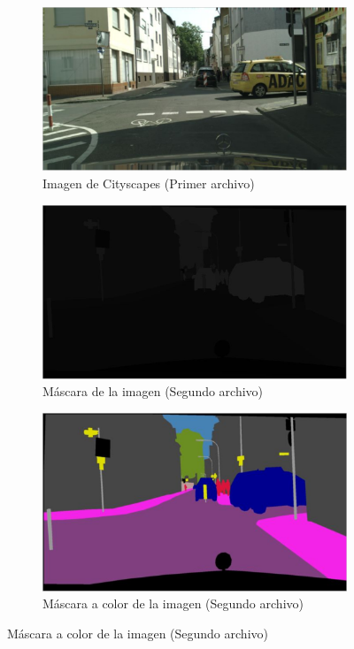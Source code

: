 \begin{figure}[H]
  \centering
    \begin{subfigure}[b]{0.45\linewidth}
    \includegraphics[width=\linewidth]{Figuras/Imagen_Cityscapes.eps}
    \caption{Imagen de Cityscapes (Primer archivo)}
  \end{subfigure}
    \begin{subfigure}[b]{0.45\linewidth}
    \includegraphics[width=\linewidth]{Figuras/Mascara_Cityscapes.eps}
    \caption{Máscara de la imagen (Segundo archivo)}
  \end{subfigure}
      \begin{subfigure}[b]{0.45\linewidth}
    \includegraphics[width=\linewidth]{Figuras/Mascara_Color.eps}
    \caption{Máscara a color de la imagen (Segundo archivo)}
  \end{subfigure}
\end{figure}

